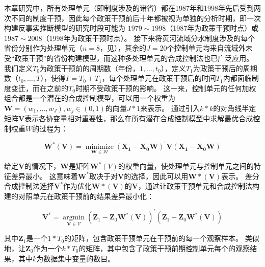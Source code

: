 本章研究中，所有处理单元（即制度涉及的诸省）都在1987年和1998年先后受到两次不同的制度干预，因此每个政策干预前后十年都被视为单独的分析时期，即一次构建反事实推断模型的研究时段可能为 $1979 \sim 1998$（1987年为政策干预时点）或 $1987 \sim 2008$（1998年为政策干预时点）。
接下来将黄河流域分水制度涉及的每个省份分别作为处理单元（$n=8$，见\textbf{}），其余的$J=20$个控制单元均来自流域外未受“政策干预”的省份构建模型，而这种多处理单元的合成控制法也已广泛应用\cite{abadie2021}。
我们定义$T_0$为政策干预前的周期数（年份，$1,\ldots,t_0$），定义$T_1$为政策干预后的周期数（$t_0,\ldots,T$），使得$T = T_0+ T_1$，每个处理单元在政策干预后的时间$T_1$内都面临制度变迁，而在之前的$T_0$时期不受政策干预的影响。
这一来，控制单元的任何加权组合都是一个潜在的合成控制模型，可以用一个权重为$\mathbf{W} = (w_{1},\ldots,w_{J}), w_j \in (0, 1)$的向量$J * 1$来表示。
通过引入$k * k$的对角线半定矩阵$\mathbf{V}$表示各协变量相对重要性，那么在所有潜在合成控制模型中求解最优合成控制权重$W$的过程为：

\begin{equation}
    \mathbf{W^{*}(V)}=\underset{\mathbf{W} \in \mathcal{W}}{\operatorname{minimize}}\left(\mathbf{X}_{\mathbf{1}}-\mathbf{X}_{\mathbf{0}} \mathbf{W}\right)^{\prime} \mathbf{V}\left(\mathbf{X}_{\mathbf{1}}-\mathbf{X}_{\mathbf{0}} \mathbf{W}\right)
\end{equation}

给定$\mathbf{V}$的情况下，$\mathbf{W}$是矩阵$\mathbf{W}^{*}(V)$的权重向量，使处理单元与控制单元之间的特征差异最小。
这意味着$\mathbf{W^{*}}$取决于对$\mathbf{V}$的选择，因此可以用$\mathbf{W*(V)}$表示。
差分合成控制法选择$\mathbf{V^{*}}$作为优化$\mathbf{W*(V)}$的$\mathbf{V}$，通过让政策干预单元和合成控制法构建的对照单元在政策干预前的结果差异最小化：

\begin{equation}
    \mathbf{V}^{*}=\underset{\mathbf{V} \in \mathcal{V}}{\operatorname{argmin}}\left(\mathbf{Z}_{1}-\mathbf{Z}_{0} \mathbf{W}^{*}(\mathbf{V})\right)^{\prime}\left(\mathbf{Z}_{1}-\mathbf{Z}_{0} \mathbf{W}^{*}(\mathbf{V})\right)
\end{equation}

其中$\mathbf{Z}_{1}$是一个$1*T_0$的矩阵，包含政策干预单元在干预前的每一个观察样本。
类似地，让$\mathbf{Z}_{0}$作为一个$k * T_0$的矩阵，其中包含了政策干预前期控制单元每个的观察结果，其中$k$为数据集中变量的数目。


